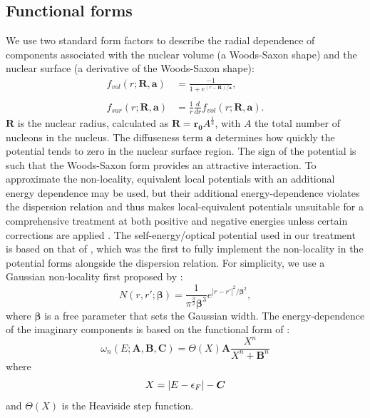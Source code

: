 \subsection{Functional forms}
We use two standard form factors
to describe the radial dependence of components
associated with the nuclear volume (a Woods-Saxon shape)
and the nuclear surface (a derivative of the Woods-Saxon shape):
\begin{equation} \label{WoodsSaxon}
    \begin{split}
        f_{vol}(r; \bm{R}, \bm{a}) & = \frac{-1}{1+e^{(r-\bm{R})/\bm{a}}},\\
        \\
        f_{sur}(r; \bm{R}, \bm{a}) & = \frac{1}{r}\frac{d}{dr}f_{vol}(r; \bm{R},
        \bm{a}).
    \end{split}
\end{equation}
$\bm{R}$ is the nuclear radius, calculated as $\bm{R} = \bm{r_{0}}A^{\frac{1}{3}}$, with $A$ the total number of
nucleons in the nucleus. The diffuseness term $\bm{a}$ determines how quickly the potential tends to
zero in the nuclear surface region.
The sign of the potential is such that the Woods-Saxon form
provides an attractive interaction.
To approximate the non-locality, equivalent local potentials \cite{Mahaux1991}
with an additional energy dependence may be used, but their additional energy-dependence
violates the dispersion relation and thus makes local-equivalent potentials unsuitable
for a comprehensive treatment at both positive and negative energies unless
certain corrections are applied \cite{Mahaux1991}.
The self-energy/optical potential used in our treatment is based on that of
\cite{MahzoonPhDThesis}, which was the first to fully implement the non-locality in the potential
forms alongside the dispersion relation. For simplicity, we use a Gaussian
non-locality first proposed by \cite{Perey1962}:
\begin{equation}
    N(r, r';\bm{\beta}) = \frac{1}{\pi^{\frac{3}{2}}\bm{\beta}^{3}}
    e^{|r-r'|^{2}/{\bm{\beta}^{2}}},
\end{equation}
where $\bm{\beta}$ is a free parameter that sets the Gaussian width. The energy-dependence of the
imaginary components is based on the functional form of \cite{Charity2006}:
\begin{equation} \label{omega}
    \omega_{n}(E; \bm{A}, \bm{B}, \bm{C}) = \Theta(X)\bm{A}\frac{X^{n}}{X^{n}+\bm{B}^{n}}
\end{equation}
where
\begin{equation*}
    X = |E-\epsilon_{F}|-\bm{C}\\
\end{equation*}
and $\Theta(X)$ is the Heaviside step function. 

